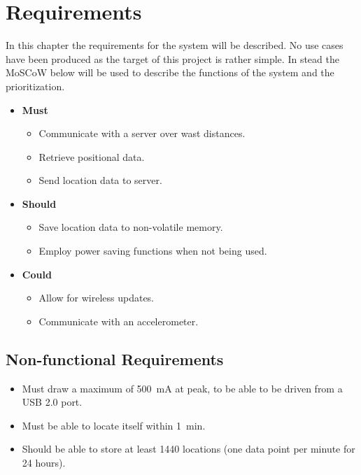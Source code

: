 
\chapter{Requirements}

In this chapter the requirements for the system will be described.
No use cases have been produced as the target of this project is rather simple.
In stead the MoSCoW below will be used to describe the functions of the system and the prioritization.

\begin{itemize}
	\item \textbf{Must}
	\begin{itemize}
		\item Communicate with a server over wast distances.
		\item Retrieve positional data.
		\item Send location data to server.
	\end{itemize}
	\item \textbf{Should}
	\begin{itemize}
		\item Save location data to non-volatile memory.
		\item Employ power saving functions when not being used.
	\end{itemize}
	\item \textbf{Could}
	\begin{itemize}
		\item Allow for wireless updates.
		\item Communicate with an accelerometer.
	\end{itemize}
\end{itemize}

\section{Non-functional Requirements}
\begin{itemize}
	\item Must draw a maximum of \SI{500}{\milli\ampere} at peak, to be able to be driven from a USB 2.0 port.
	\item Must be able to locate itself within \SI{1}{\minute}.
	\item Should be able to store at least \num{1440} locations (one data point per minute for \num{24} hours).
\end{itemize}